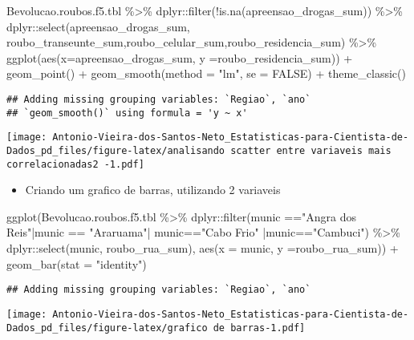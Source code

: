 \documentclass[
]{article}
\newenvironment{Shaded}{\begin{snugshade}}{\end{snugshade}}
\newcommand{\AttributeTok}[1]{\textcolor[rgb]{0.77,0.63,0.00}{#1}}
\newcommand{\ConstantTok}[1]{\textcolor[rgb]{0.00,0.00,0.00}{#1}}
\newcommand{\FunctionTok}[1]{\textcolor[rgb]{0.00,0.00,0.00}{#1}}
\newcommand{\NormalTok}[1]{#1}
\newcommand{\SpecialCharTok}[1]{\textcolor[rgb]{0.00,0.00,0.00}{#1}}
\newcommand{\StringTok}[1]{\textcolor[rgb]{0.31,0.60,0.02}{#1}}
\providecommand{\tightlist}{%
  \setlength{\itemsep}{0pt}\setlength{\parskip}{0pt}}
\begin{document}
\begin{Shaded}
\begin{Highlighting}[]
\NormalTok{Bevolucao.roubos.f5.tbl }\SpecialCharTok{\%\textgreater{}\%}\NormalTok{ dplyr}\SpecialCharTok{::}\FunctionTok{filter}\NormalTok{(}\SpecialCharTok{!}\FunctionTok{is.na}\NormalTok{(apreensao\_drogas\_sum)) }\SpecialCharTok{\%\textgreater{}\%}\NormalTok{ dplyr}\SpecialCharTok{::}\FunctionTok{select}\NormalTok{(apreensao\_drogas\_sum, roubo\_transeunte\_sum,roubo\_celular\_sum,roubo\_residencia\_sum) }\SpecialCharTok{\%\textgreater{}\%} \FunctionTok{ggplot}\NormalTok{(}\FunctionTok{aes}\NormalTok{(}\AttributeTok{x=}\NormalTok{apreensao\_drogas\_sum, }\AttributeTok{y =}\NormalTok{roubo\_residencia\_sum)) }\SpecialCharTok{+} \FunctionTok{geom\_point}\NormalTok{() }\SpecialCharTok{+} \FunctionTok{geom\_smooth}\NormalTok{(}\AttributeTok{method =} \StringTok{"lm"}\NormalTok{, }\AttributeTok{se =} \ConstantTok{FALSE}\NormalTok{) }\SpecialCharTok{+} \FunctionTok{theme\_classic}\NormalTok{()}
\end{Highlighting}
\end{Shaded}

\begin{verbatim}
## Adding missing grouping variables: `Regiao`, `ano`
## `geom_smooth()` using formula = 'y ~ x'
\end{verbatim}

\texttt{[image: Antonio-Vieira-dos-Santos-Neto\_Estatisticas-para-Cientista-de-Dados\_pd\_files/figure-latex/analisando scatter entre variaveis mais correlacionadas2 -1.pdf]}

\begin{itemize}
\tightlist
\item
  Criando um grafico de barras, utilizando 2 variaveis
\end{itemize}

\begin{Shaded}
\begin{Highlighting}[]
\FunctionTok{ggplot}\NormalTok{(Bevolucao.roubos.f5.tbl }\SpecialCharTok{\%\textgreater{}\%}\NormalTok{ dplyr}\SpecialCharTok{::}\FunctionTok{filter}\NormalTok{(munic }\SpecialCharTok{==}\StringTok{"Angra dos Reis"}\SpecialCharTok{|}\NormalTok{munic }\SpecialCharTok{==} \StringTok{"Araruama"}\SpecialCharTok{|}\NormalTok{ munic}\SpecialCharTok{==}\StringTok{"Cabo Frio"} \SpecialCharTok{|}\NormalTok{munic}\SpecialCharTok{==}\StringTok{"Cambuci"}\NormalTok{) }\SpecialCharTok{\%\textgreater{}\%}\NormalTok{ dplyr}\SpecialCharTok{::}\FunctionTok{select}\NormalTok{(munic, roubo\_rua\_sum), }\FunctionTok{aes}\NormalTok{(}\AttributeTok{x =}\NormalTok{ munic, }\AttributeTok{y =}\NormalTok{roubo\_rua\_sum)) }\SpecialCharTok{+} \FunctionTok{geom\_bar}\NormalTok{(}\AttributeTok{stat =} \StringTok{"identity"}\NormalTok{)}
\end{Highlighting}
\end{Shaded}

\begin{verbatim}
## Adding missing grouping variables: `Regiao`, `ano`
\end{verbatim}

\texttt{[image: Antonio-Vieira-dos-Santos-Neto\_Estatisticas-para-Cientista-de-Dados\_pd\_files/figure-latex/grafico de barras-1.pdf]}
\end{document}
